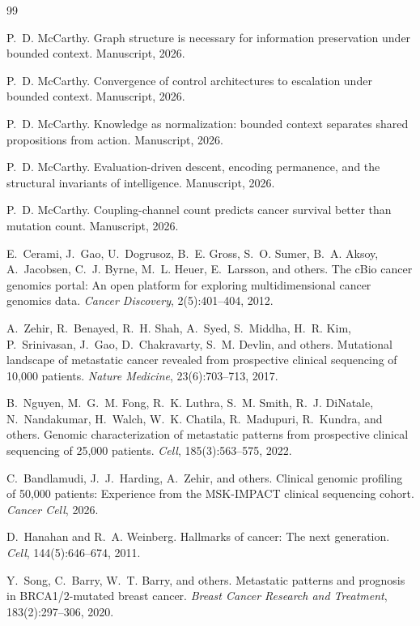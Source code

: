 \documentclass[11pt]{article}
\begin{document}

\begin{thebibliography}{99}

P.~D. McCarthy.
\newblock Graph structure is necessary for information preservation under
  bounded context.
\newblock Manuscript, 2026.

P.~D. McCarthy.
\newblock Convergence of control architectures to escalation under bounded
  context.
\newblock Manuscript, 2026.

P.~D. McCarthy.
\newblock Knowledge as normalization: bounded context separates shared
  propositions from action.
\newblock Manuscript, 2026.

P.~D. McCarthy.
\newblock Evaluation-driven descent, encoding permanence, and the structural
  invariants of intelligence.
\newblock Manuscript, 2026.

P.~D. McCarthy.
\newblock Coupling-channel count predicts cancer survival better than mutation
  count.
\newblock Manuscript, 2026.

E.~Cerami, J.~Gao, U.~Dogrusoz, B.~E. Gross, S.~O. Sumer,
  B.~A. Aksoy, A.~Jacobsen, C.~J. Byrne, M.~L. Heuer,
  E.~Larsson, and others.
\newblock The {cBio} cancer genomics portal: An open platform for
  exploring multidimensional cancer genomics data.
\newblock \emph{Cancer Discovery}, 2(5):401--404, 2012.

A.~Zehir, R.~Benayed, R.~H. Shah, A.~Syed, S.~Middha,
  H.~R. Kim, P.~Srinivasan, J.~Gao, D.~Chakravarty,
  S.~M. Devlin, and others.
\newblock Mutational landscape of metastatic cancer revealed from
  prospective clinical sequencing of 10,000 patients.
\newblock \emph{Nature Medicine}, 23(6):703--713, 2017.

B.~Nguyen, M.~G.~M. Fong, R.~K. Luthra, S.~M. Smith,
  R.~J. DiNatale, N.~Nandakumar, H.~Walch, W.~K. Chatila,
  R.~Madupuri, R.~Kundra, and others.
\newblock Genomic characterization of metastatic patterns from
  prospective clinical sequencing of 25,000 patients.
\newblock \emph{Cell}, 185(3):563--575, 2022.

C.~Bandlamudi, J.~J.~Harding, A.~Zehir, and others.
\newblock Clinical genomic profiling of 50,000 patients:
  Experience from the {MSK-IMPACT} clinical sequencing cohort.
\newblock \emph{Cancer Cell}, 2026.

D.~Hanahan and R.~A. Weinberg.
\newblock Hallmarks of cancer: The next generation.
\newblock \emph{Cell}, 144(5):646--674, 2011.

Y.~Song, C.~Barry, W.~T. Barry, and others.
\newblock Metastatic patterns and prognosis in {BRCA1/2}-mutated breast cancer.
\newblock \emph{Breast Cancer Research and Treatment}, 183(2):297--306, 2020.

\end{thebibliography}
\end{document}
